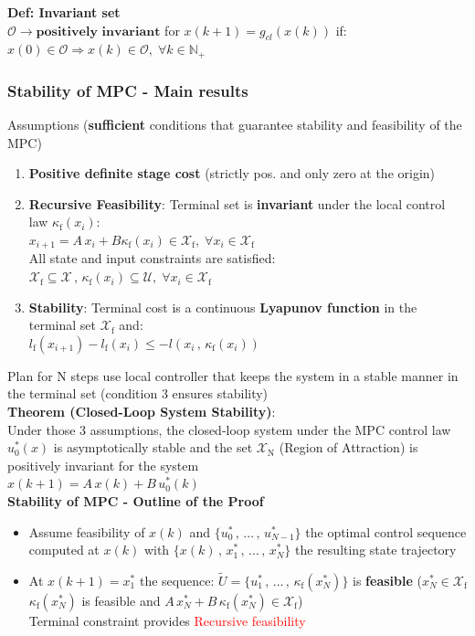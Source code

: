 \textbf{Def: Invariant set}\\
$\mathcal{O}\rightarrow \textbf{positively invariant}$ for $x(k+1)=g_{cl}(x(k))$ if:\\
$x(0)\in\mathcal{O}\Rightarrow x(k)\in\mathcal{O}, \;\forall k\in\mathbb{N}_+$\\
\subsubsection{Stability of MPC - Main results}
Assumptions (\textbf{sufficient} conditions that guarantee stability and feasibility of the MPC)
\begin{enumerate}
    \item \textbf{Positive definite stage cost} (strictly pos. and only zero at the origin)
    \item \textbf{Recursive Feasibility}: Terminal set is \textbf{invariant} under the local control law $\kappa_\text{f}(x_i)$:\\
    $x_{i+1}=A\,x_i+B\kappa_\text{f}(x_i)\in\mathcal{X}_\text{f},\;\forall x_i\in\mathcal{X}_\text{f}$\\
    All state and input constraints are satisfied:\\
    $\mathcal{X}_\text{f}\subseteq\mathcal{X}\,,\,\kappa_\text{f}(x_i)\subseteq\mathcal{U},\;\forall x_i\in\mathcal{X}_\text{f}$
    \item \textbf{Stability}: Terminal cost is a continuous \textbf{Lyapunov function} in the terminal set $\mathcal{X}_\text{f}$ and:\\
    $l_\text{f}(x_{i+1})-l_\text{f}(x_i)\leq-l(x_i\,,\,\kappa_\text{f}(x_i))$
\end{enumerate}
Plan for N steps \rightarrow use local controller that keeps the system in a stable manner in the terminal set (condition 3 ensures stability)\\
\textbf{Theorem (Closed-Loop System Stability)}:\\
Under those 3 assumptions, the closed-loop system under the MPC control law $u_0^*(x)$ is asymptotically stable and the set $\mathcal{X}_\text{N}$ (Region of Attraction) is positively invariant for the system\\
$x(k+1)=A\,x(k)+B\,u_0^*(k)$\\
\textbf{Stability of MPC - Outline of the Proof}\\
\begin{itemize}
    \item Assume feasibility of $x(k)$ and $\{u_0^*\,,\,...\,,\,u_{N-1}^*\}$ the optimal control sequence computed at $x(k)$ with $\{x(k)\,,\,x_1^*\,,\,...\,,\,x_N^*\}$ the resulting state trajectory
    \item At $x(k+1)=x_1^*$ the sequence: $\tilde{U}=\{u_1^*\,,\,...\,,\,\kappa_\text{f}(x_N^*)\}$ is \textbf{feasible} ($x_N^*\in\mathcal{X}_\text{f}$\rightarrow $\kappa_\text{f}(x_N^*)$ is feasible and $A\,x_N^*+B\,\kappa_\text{f}(x_N^*)\in\mathcal{X}_\text{f}$)\\
    \Rightarrow Terminal constraint provides \textcolor{red}{Recursive feasibility}
\end{itemize}

